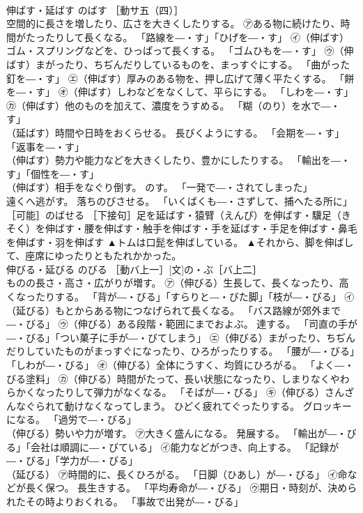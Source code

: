 \documentclass[8pt]{extreport}
\begin{document}
\begin{CJK}{UTF8}{min}
\\	伸ばす・延ばす	のばす	［動サ五（四）］ 
\\	空間的に長さを増したり、広さを大きくしたりする。 ㋐ある物に続けたり、時間がたったりして長くなる。 「路線を―・す」「ひげを―・す」 ㋑（伸ばす）ゴム・スプリングなどを、ひっぱって長くする。 「ゴムひもを―・す」 ㋒（伸ばす）まがったり、ちぢんだりしているものを、まっすぐにする。 「曲がった釘を―・す」 ㋓（伸ばす）厚みのある物を、押し広げて薄く平たくする。 「餅を―・す」 ㋔（伸ばす）しわなどをなくして、平らにする。 「しわを―・す」 ㋕（伸ばす）他のものを加えて、濃度をうすめる。 「糊（のり）を水で―・す」 
\\	（延ばす）時間や日時をおくらせる。 長びくようにする。 「会期を―・す」「返事を―・す」 
\\	（伸ばす）勢力や能力などを大きくしたり、豊かにしたりする。 「輸出を―・す」「個性を―・す」 
\\	（伸ばす）相手をなぐり倒す。 のす。 「一発で―・されてしまった」 
\\	遠くへ逃がす。 落ちのびさせる。 「いくばくも―・さずして、捕へたる所に」 ［可能］のばせる ［下接句］足を延ばす・猿臂（えんぴ）を伸ばす・驥足（きそく）を伸ばす・腰を伸ばす・触手を伸ばす・手を延ばす・手足を伸ばす・鼻毛を伸ばす・羽を伸ばす	▲トムは口髭を伸ばしている。 ▲それから、脚を伸ばして、座席にゆったりともたれかかった。
\\	伸びる・延びる	のびる	［動バ上一］[文]の・ぶ［バ上二］ 
\\	ものの長さ・高さ・広がりが増す。 ㋐（伸びる）生長して、長くなったり、高くなったりする。 「背が―・びる」「すらりと―・びた脚」「枝が―・びる」 ㋑（延びる）もとからある物につなげられて長くなる。 「バス路線が郊外まで―・びる」 ㋒（伸びる）ある段階・範囲にまでおよぶ。 達する。 「司直の手が―・びる」「つい菓子に手が―・びてしまう」 ㋓（伸びる）まがったり、ちぢんだりしていたものがまっすぐになったり、ひろがったりする。 「腰が―・びる」「しわが―・びる」 ㋔（伸びる）全体にうすく、均質にひろがる。 「よく―・びる塗料」 ㋕（伸びる）時間がたって、長い状態になったり、しまりなくやわらかくなったりして弾力がなくなる。 「そばが―・びる」 ㋖（伸びる）さんざんなぐられて動けなくなってしまう。 ひどく疲れてぐったりする。 グロッキーになる。 「過労で―・びる」 
\\	（伸びる）勢いや力が増す。 ㋐大きく盛んになる。 発展する。 「輸出が―・びる」「会社は順調に―・びている」 ㋑能力などがつき、向上する。 「記録が―・びる」「学力が―・びる」 
\\	（延びる） ㋐時間的に、長くひろがる。 「日脚（ひあし）が―・びる」 ㋑命などが長く保つ。 長生きする。 「平均寿命が―・びる」 ㋒期日・時刻が、決められたその時よりおくれる。 「事故で出発が―・びる」 

\end{CJK}
\end{document}
